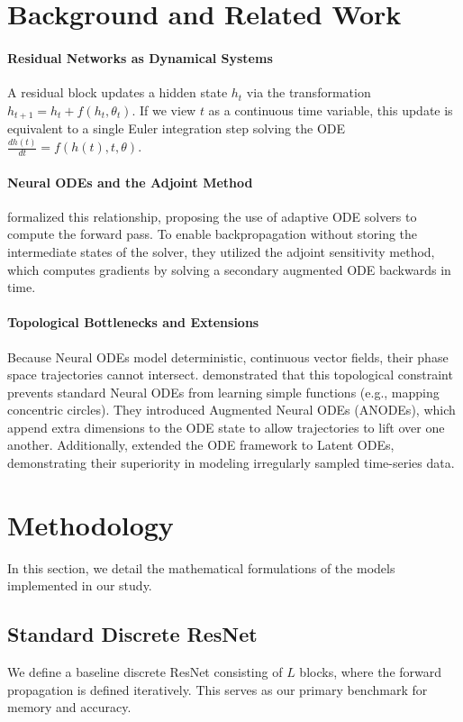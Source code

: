 \documentclass{article}
\begin{document}
\section{Background and Related Work}

\paragraph{Residual Networks as Dynamical Systems}
A residual block updates a hidden state $h_t$ via the transformation $h_{t+1} = h_t + f(h_t, \theta_t)$. If we view $t$ as a continuous time variable, this update is equivalent to a single Euler integration step solving the ODE $\frac{dh(t)}{dt} = f(h(t), t, \theta)$.

\paragraph{Neural ODEs and the Adjoint Method}
\citet{chen2018neural} formalized this relationship, proposing the use of adaptive ODE solvers to compute the forward pass. To enable backpropagation without storing the intermediate states of the solver, they utilized the adjoint sensitivity method, which computes gradients by solving a secondary augmented ODE backwards in time. 

\paragraph{Topological Bottlenecks and Extensions}
Because Neural ODEs model deterministic, continuous vector fields, their phase space trajectories cannot intersect. \citet{dupont2019augmented} demonstrated that this topological constraint prevents standard Neural ODEs from learning simple functions (e.g., mapping concentric circles). They introduced Augmented Neural ODEs (ANODEs), which append extra dimensions to the ODE state to allow trajectories to lift over one another. Additionally, \citet{rubanova2019latent} extended the ODE framework to Latent ODEs, demonstrating their superiority in modeling irregularly sampled time-series data.

\section{Methodology}

In this section, we detail the mathematical formulations of the models implemented in our study.

\subsection{Standard Discrete ResNet}
We define a baseline discrete ResNet consisting of $L$ blocks, where the forward propagation is defined iteratively. This serves as our primary benchmark for memory and accuracy.
\end{document}
